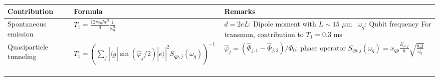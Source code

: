 \documentclass[]{article}
\newcommand{\ket}[1]{| #1 \rangle}
\newcommand{\bra}[1]{\langle #1 |}
\begin{document}
\begin{table}[h]
\hspace*{-2cm}
\centering
\begin{tabular}{|p{2cm}|p{5.7cm}|p{7.5cm}|}
	\hline 
Contribution	& Formula & Remarks \\ 
\hline \hline 
Spontaneous emission & $T_1 = \frac{12 \pi \epsilon_0 \hbar c^3}{d} \frac{1}{\omega_q^3}$~\cite{koch2007} & $d=2eL$: Dipole moment with $L\sim 15$ $\mu$m~\cite{koch2007} \newline $\omega_q$: Qubit frequency \newline
For transmon, contribution to $T_1=0.3$ ms~\cite{koch2007} \\
\hline
Quasiparticle tunneling & $T_1 = \left( \sum_j \left| \bra{g} \sin ( \hat{\varphi}_j/2) \ket{e} \right|^{2} S_{qp, j} (\omega_q) \right) ^{-1} $~\cite{catelani2011}& $\hat{\varphi}_j = (\hat{\Phi}_{j,1}-\hat{\Phi}_{j,2}) / \Phi_0$: phase operator \newline
$S_{qp, j} (\omega_q) = x_{qp}\frac{E_{J, j}}{h}\sqrt{\frac{8 \Delta}{\omega_q}}$~\cite{yan2016} \newline 

\end{tabular}
\end{table}
\end{document}
